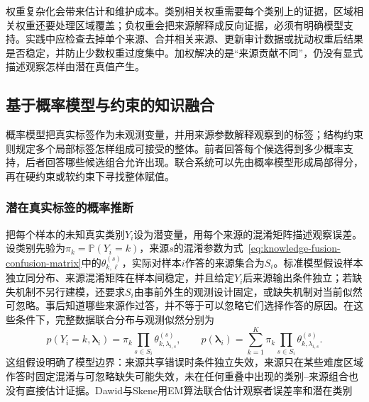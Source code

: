 权重复杂化会带来估计和维护成本。类别相关权重需要每个类别上的证据，区域相关权重还要处理区域覆盖；负权重会把来源解释成反向证据，必须有明确模型支持。实践中应检查去掉单个来源、合并相关来源、更新审计数据或扰动权重后结果是否稳定，并防止少数权重过度集中。加权解决的是“来源贡献不同”，仍没有显式描述观察怎样由潜在真值产生。

\subsection{基于概率模型与约束的知识融合}
\label{sec:knowledge-fusion-probabilistic-constrained}

概率模型把真实标签作为未观测变量，并用来源参数解释观察到的标签；结构约束则规定多个局部标签怎样组成可接受的整体。前者回答每个候选得到多少概率支持，后者回答哪些候选组合允许出现。联合系统可以先由概率模型形成局部得分，再在硬约束或软约束下寻找整体赋值。

\subsubsection{潜在真实标签的概率推断}
\label{sec:knowledge-fusion-latent-label-inference}

把每个样本的未知真实类别$Y_i$设为潜变量，用每个来源的混淆矩阵描述观察误差。设类别先验为$\pi_k=\mathbb{P}(Y_i=k)$，来源$s$的混淆参数为式~\eqref{eq:knowledge-fusion-confusion-matrix}中的$\theta^{(s)}_{k,\ell}$，实际对样本$i$作答的来源集合为$S_i$。标准模型假设样本独立同分布、来源混淆矩阵在样本间稳定，并且给定$Y_i$后来源输出条件独立；若缺失机制不另行建模，还要求$S_i$由事前外生的观测设计固定，或缺失机制对当前似然可忽略。事后知道哪些来源作过答，并不等于可以忽略它们选择作答的原因。在这些条件下，完整数据联合分布与观测似然分别为
\begin{equation}
  p(Y_i=k,\bm{\lambda}_i)
  =\pi_k\prod_{s\in S_i}\theta^{(s)}_{k,\lambda_{i,s}},
  \qquad
  p(\bm{\lambda}_i)
  =\sum_{k=1}^{K}\pi_k
    \prod_{s\in S_i}\theta^{(s)}_{k,\lambda_{i,s}}.
  \label{eq:knowledge-fusion-dawid-skene}
\end{equation}
这组假设明确了模型边界：来源共享错误时条件独立失效，来源只在某些难度区域作答时固定混淆与可忽略缺失可能失效，未在任何重叠中出现的类别--来源组合也没有直接估计证据。Dawid与Skene用EM算法联合估计观察者误差率和潜在类别

